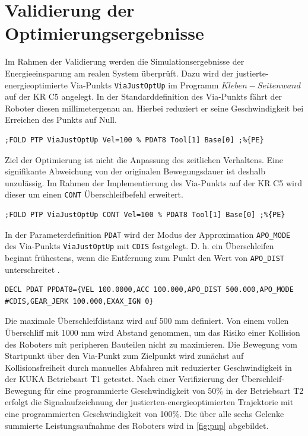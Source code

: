\section{Validierung der Optimierungsergebnisse}
Im Rahmen der Validierung werden die Simulationsergebnisse der Energieeinsparung am realen System überprüft. Dazu wird der 
justierte-energieoptimierte Via-Punkts \lstinline{ViaJustOptUp}
im Programm $Kleben-Seitenwand$ auf der KR C5 angelegt. In der Standarddefinition des Via-Punkts fährt der Roboter diesen millimetergenau an. Hierbei reduziert er seine Geschwindigkeit bei Erreichen des Punkts auf Null. 
%
\begin{lstlisting}[numbers=none]
	;FOLD PTP ViaJustOptUp Vel=100 % PDAT8 Tool[1] Base[0] ;%{PE}
\end{lstlisting}
%
Ziel der Optimierung ist nicht die Anpassung des zeitlichen Verhaltens. Eine signifikante Abweichung von der originalen Bewegungsdauer ist deshalb unzulässig. Im Rahmen der Implementierung des Via-Punkts auf der KR C5 wird dieser um einen \lstinline{CONT} 
Überschleifbefehl erweitert. 
%
\begin{lstlisting}[numbers=none]
	;FOLD PTP ViaJustOptUp CONT Vel=100 % PDAT8 Tool[1] Base[0] ;%{PE}
\end{lstlisting}
%
In der Parameterdefinition \lstinline{PDAT} 
wird der Modus der Approximation \lstinline{APO_MODE}  
des Via-Punkts \lstinline{ViaJustOptUp}
mit \lstinline{CDIS}  
festgelegt. D. h. ein Überschleifen beginnt frühestens, wenn die Entfernung zum Punkt den Wert von \lstinline{APO_DIST}    
unterschreitet \cite[S.~578]{KSS.2023}.
%
\begin{lstlisting}[numbers=none]
	DECL PDAT PPDAT8={VEL 100.0000,ACC 100.000,APO_DIST 500.000,APO_MODE #CDIS,GEAR_JERK 100.000,EXAX_IGN 0}
\end{lstlisting}
Die maximale Überschleifdistanz wird auf 500 mm definiert. Von einem vollen Überschliff mit 1000 mm wird Abstand genommen, um das Risiko einer Kollision des Roboters mit peripheren Bauteilen nicht zu maximieren. Die Bewegung vom Startpunkt über den Via-Punkt zum Zielpunkt wird zunächst auf Kollisionsfreiheit durch manuelles Abfahren mit reduzierter Geschwindigkeit in der KUKA Betriebsart T1 getestet. Nach einer Verifizierung der Überschleif-Bewegung für eine programmierte Geschwindigkeit von 50\% in der Betriebsart T2 erfolgt die Signalaufzeichnung der justierten-energieoptimierten Trajektorie mit eine programmierten Geschwindigkeit von 100\%. Die über alle sechs Gelenke summierte Leistungsaufnahme des Roboters  wird in \ref{fig:pup} abgebildet. 

